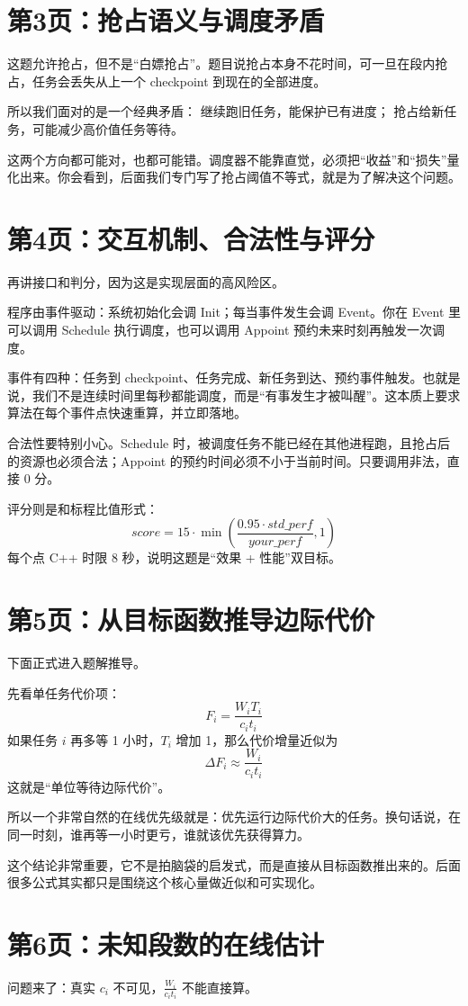 \documentclass[12pt]{article}
\begin{document}
\section*{第3页：抢占语义与调度矛盾}
这题允许抢占，但不是“白嫖抢占”。题目说抢占本身不花时间，可一旦在段内抢占，任务会丢失从上一个 checkpoint 到现在的全部进度。

所以我们面对的是一个经典矛盾：
继续跑旧任务，能保护已有进度；
抢占给新任务，可能减少高价值任务等待。

这两个方向都可能对，也都可能错。调度器不能靠直觉，必须把“收益”和“损失”量化出来。你会看到，后面我们专门写了抢占阈值不等式，就是为了解决这个问题。

\section*{第4页：交互机制、合法性与评分}
再讲接口和判分，因为这是实现层面的高风险区。

程序由事件驱动：系统初始化会调 Init；每当事件发生会调 Event。你在 Event 里可以调用 Schedule 执行调度，也可以调用 Appoint 预约未来时刻再触发一次调度。

事件有四种：任务到 checkpoint、任务完成、新任务到达、预约事件触发。也就是说，我们不是连续时间里每秒都能调度，而是“有事发生才被叫醒”。这本质上要求算法在每个事件点快速重算，并立即落地。

合法性要特别小心。Schedule 时，被调度任务不能已经在其他进程跑，且抢占后的资源也必须合法；Appoint 的预约时间必须不小于当前时间。只要调用非法，直接 0 分。

评分则是和标程比值形式：
\[
score=15\cdot\min\left(\frac{0.95\cdot std\_perf}{your\_perf},1\right)
\]
每个点 C++ 时限 8 秒，说明这题是“效果 + 性能”双目标。

\section*{第5页：从目标函数推导边际代价}
下面正式进入题解推导。

先看单任务代价项：
\[
F_i=\frac{W_i T_i}{c_i t_i}
\]
如果任务 $i$ 再多等 1 小时，$T_i$ 增加 1，那么代价增量近似为
\[
\Delta F_i\approx\frac{W_i}{c_i t_i}
\]
这就是“单位等待边际代价”。

所以一个非常自然的在线优先级就是：优先运行边际代价大的任务。换句话说，在同一时刻，谁再等一小时更亏，谁就该优先获得算力。

这个结论非常重要，它不是拍脑袋的启发式，而是直接从目标函数推出来的。后面很多公式其实都只是围绕这个核心量做近似和可实现化。

\section*{第6页：未知段数的在线估计}
问题来了：真实 $c_i$ 不可见，$\frac{W_i}{c_i t_i}$ 不能直接算。
\end{document}
